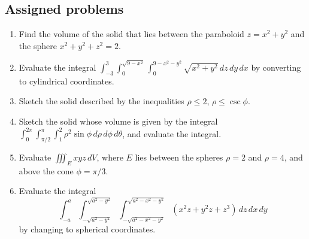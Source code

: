 \documentclass[letterpaper,12pt]{article}
\newcommand{\di}{\displaystyle}
\begin{document}
\subsection*{Assigned problems}
\begin{enumerate}
\item  Find the volume of the solid that lies between the paraboloid $z=x^2+y^2$ and the sphere $x^2+y^2+z^2=2$.

\item  Evaluate the integral $\di \int_{-3}^3\int_0^{\sqrt{9-x^2}}\int_0^{9-x^2-y^2}\sqrt{x^2+y^2}\, dz\,dy\,dx$ by converting to cylindrical coordinates.

\item  Sketch the solid described by the inequalities $\rho\leq 2$, $\rho\leq \csc \phi$.

\item  Sketch the solid whose volume is given by the integral $\di \int_0^{2\pi}\int_{\pi/2}^\pi\int_1^2\rho^2\sin\phi\, d\rho\, d\phi\, d\theta$, and evaluate the integral.

\item  Evaluate $\iiint_E xyz\, dV$, where $E$ lies between the spheres $\rho =2$ and $\rho = 4$, and above the cone $\phi = \pi/3$.

\item  Evaluate the integral 
\[
\di \int_{-a}^a\int_{-\sqrt{a^2-y^2}}^{\sqrt{a^2-y^2}}\int_{-\sqrt{a^2-x^2-y^2}}^{\sqrt{a^2-x^2-y^2}}(x^2z+y^2z+z^3)\, dz\,dx\,dy
\]
by changing to spherical coordinates.


\end{enumerate}
\end{document}
